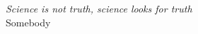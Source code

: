 
	
\normalsize
\textit{Science is not truth, science looks for truth}
\\\vspace{10pt}\normalsize Somebody

